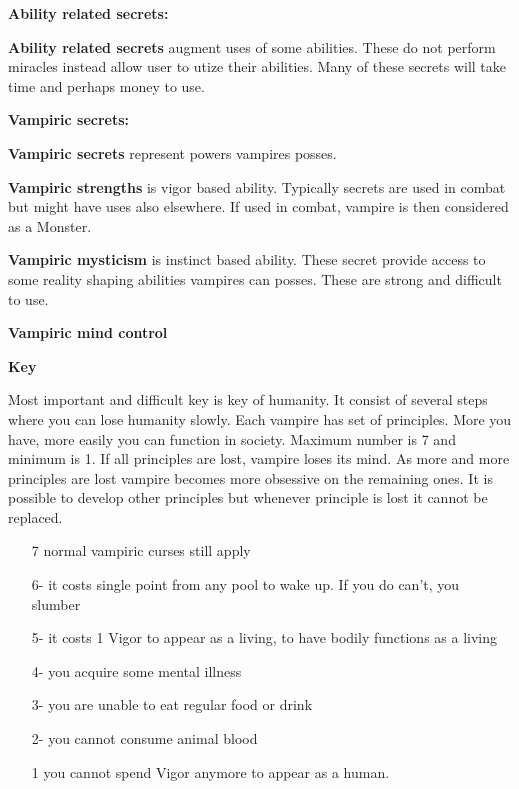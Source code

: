 \documentclass[a4paper, 12pt, finnish]{report}
\begin{document}
\cols{
\CultureSecret{}
}

\textbf{Ability related secrets:}

\textbf{Ability related secrets} augment uses of some abilities. 
These do not perform miracles instead allow user to utize their abilities.
Many of these secrets will take time and perhaps money to use.

\cols{
\AbilitySecret{}
}


\pagebreak

\textbf{Vampiric secrets:}

\textbf{Vampiric secrets} represent powers vampires posses.

\textbf{Vampiric strengths } is vigor based ability. 
Typically secrets are used in combat but might have uses also elsewhere.
If used in combat, vampire is then considered as a Monster.


\cols{
\VampiricStrengthSecret{}
}

\textbf{Vampiric mysticism } is instinct based ability.
These secret provide access to some reality shaping abilities vampires can posses.
These are strong and difficult to use.


\cols{
\VampiricMysticismSecret{}
}

\textbf{Vampiric mind control }

\cols{
\VampiricMindControlSecret{}
}

\pagebreak


\textbf{Key}

Most important and difficult key is key of humanity. It consist of several steps where you can lose humanity slowly. 
Each vampire has set of principles.
More you have, more easily you can function in society.
Maximum number is 7 and minimum is 1.
If all principles are lost, vampire loses its mind.
As more and more principles are lost vampire becomes more obsessive on the remaining ones.
It is possible to develop other principles but whenever principle is lost it cannot be replaced.

\begin{itemize}
\setlength\itemsep{-2pt}
\item[7] normal vampiric curses still apply
\item[6-] it costs single point from any pool to wake up. If you do can't, you slumber
\item[5-] it costs 1 Vigor to appear as a living, to have bodily functions as a living
\item[4-] you acquire some mental illness
\item[3-] you are unable to eat regular food or drink
\item[2-] you cannot consume animal blood
\item[1] you cannot spend Vigor anymore to appear as a human.
\end{itemize}
\end{document}
